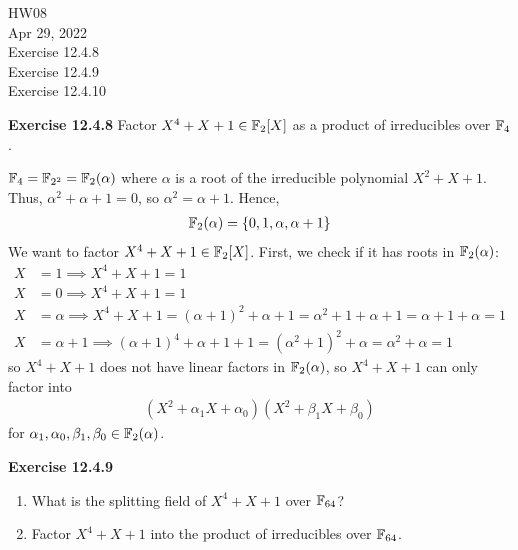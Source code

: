 \documentclass{article}
\begin{document}
\maketitle
HW08 \\
Apr 29, 2022 \\
Exercise 12.4.8\\
Exercise 12.4.9\\
Exercise 12.4.10\\
\pagebreak

\begin{homeworkProblem}
    \textbf{Exercise 12.4.8} Factor $X^4 + X + 1 \in \mathbb{F}_{2}[X]$ as a product of irreducibles over $\mathbb{F}_4$.
    \solution 

    $\mathbb{F}_4 = \mathbb{F}_{2^2} = \mathbb{F}_2 (\alpha)$ where $\alpha$ is a root of the irreducible polynomial
    $X^2 + X + 1$. Thus, $\alpha^2 + \alpha + 1 = 0$, so $\alpha^2 = \alpha + 1$. Hence,
    \begin{align}
        \mathbb{F}_2 (\alpha) = \{ 0,1,\alpha,\alpha+1 \}
    \end{align}
    We want to factor $X^4 + X + 1 \in \mathbb{F}_2[X]$. First, we check if it has
    roots in $\mathbb{F}_2 (\alpha)$: 
    \begin{align}
        X &= 1 \implies X^4 + X + 1 = 1\\
        X &= 0 \implies X^4 + X + 1 = 1\\
        X &= \alpha \implies X^4 + X + 1 = (\alpha+1)^2 + \alpha + 1 = \alpha^2 + 1 + \alpha + 1 = \alpha + 1 + \alpha = 1\\
        X &= \alpha + 1 \implies (\alpha + 1)^4 + \alpha + 1 + 1 = (\alpha^2 + 1)^2 + \alpha = \alpha^2 + \alpha = 1
    \end{align}
    so $X^4 + X + 1$ does not have linear factors in $\mathbb{F}_2(\alpha)$, so $X^4 + X + 1$
    can only factor into 
    \begin{align}
        (X^2 + \alpha_1 X + \alpha_0)(X^2 + \beta_1 X + \beta_0)
    \end{align}
    for $\alpha_1, \alpha_0, \beta_1, \beta_0 \in \mathbb{F}_2 (\alpha)$.
    

    
    



\end{homeworkProblem}

\pagebreak


\begin{homeworkProblem}
    \textbf{Exercise 12.4.9}
    \begin{enumerate}
        \item What is the splitting field of $X^4 + X + 1$ over $\mathbb{F}_{64}$?
        \item Factor $X^4 + X + 1$ into the product of irreducibles over $\mathbb{F}_{64}$.
    \end{enumerate}
    
    \solution \\

\end{homeworkProblem}
\end{document}
